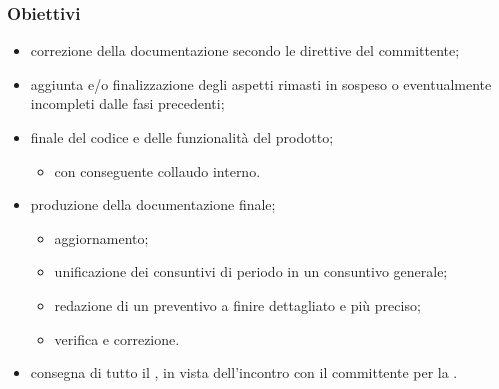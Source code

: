         \subsubsection{Obiettivi}
        \begin{itemize}
            \item correzione della documentazione secondo le direttive del committente;
            \item aggiunta e/o finalizzazione degli aspetti rimasti in sospeso o eventualmente incompleti dalle fasi precedenti;
            \item {} finale del codice e delle funzionalità del prodotto;
            \begin{itemize}
                \item con conseguente collaudo interno.
            \end{itemize}
            \item produzione della documentazione finale;
            \begin{itemize}
                \item aggiornamento;
                \item unificazione dei consuntivi di periodo in un consuntivo generale;
                \item redazione di un preventivo a finire dettagliato e più preciso;
                \item verifica e correzione.
            \end{itemize}
            \item consegna di tutto il , in vista dell'incontro con il committente per la \RA{}.
        \end{itemize}